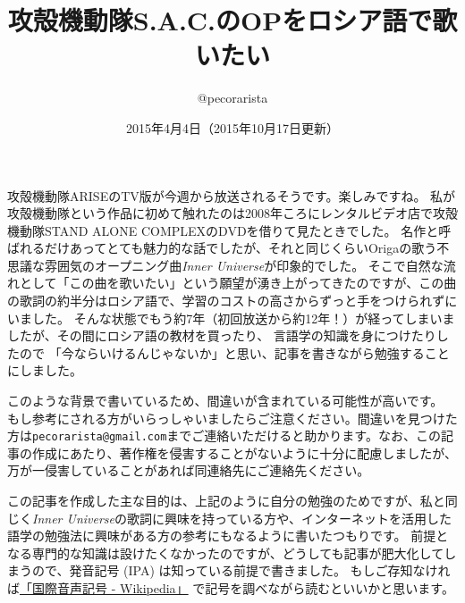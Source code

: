 \documentclass[12pt]{ltjsarticle}
\title{攻殻機動隊S.A.C.のOPをロシア語で歌いたい}
\author{@pecorarista}
\date{2015年4月4日（2015年10月17日更新）}
\begin{document}
\maketitle

攻殻機動隊ARISEのTV版が今週から放送されるそうです。楽しみですね。
私が攻殻機動隊という作品に初めて触れたのは2008年ころにレンタルビデオ店で攻殻機動隊STAND ALONE COMPLEXのDVDを借りて見たときでした。
名作と呼ばれるだけあってとても魅力的な話でしたが、それと同じくらいOrigaの歌う不思議な雰囲気のオープニング曲\textit{Inner Universe}\nocite{origa2011}が印象的でした。
そこで自然な流れとして「この曲を歌いたい」という願望が湧き上がってきたのですが、この曲の歌詞の約半分はロシア語で、学習のコストの高さからずっと手をつけられずにいました。
そんな状態でもう約7年（初回放送から約12年！）が経ってしまいましたが、その間にロシア語の教材を買ったり、
言語学の知識を身につけたりしたので 「今ならいけるんじゃないか」と思い、記事を書きながら勉強することにしました。

このような背景で書いているため、間違いが含まれている可能性が高いです。
もし参考にされる方がいらっしゃいましたらご注意ください。間違いを見つけた方は\texttt{pecorarista@gmail.com}までご連絡いただけると助かります。なお、この記事の作成にあたり、著作権を侵害することがないように十分に配慮しましたが、万が一侵害していることがあれば同連絡先にご連絡先ください。

この記事を作成した主な目的は、上記のように自分の勉強のためですが、私と同じく\textit{Inner Universe}の歌詞に興味を持っている方や、インターネットを活用した語学の勉強法に興味がある方の参考にもなるように書いたつもりです。
前提となる専門的な知識は設けたくなかったのですが、どうしても記事が肥大化してしまうので、発音記号 (IPA) は知っている前提で書きました。
もしご存知なければ\href{http://ja.wikipedia.org/wiki/%E5%9B%BD%E9%9A%9B%E9%9F%B3%E5%A3%B0%E8%A8%98%E5%8F%B7}{「国際音声記号 - Wikipedia」}
で記号を調べながら読むといいかと思います。
\end{document}
